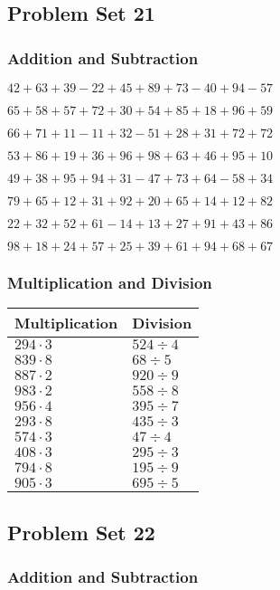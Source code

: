 \hypertarget{problem-set-21}{%
\subsection{Problem Set 21}\label{problem-set-21}}

\hypertarget{addition-and-subtraction-20}{%
\subsubsection{Addition and
Subtraction}\label{addition-and-subtraction-20}}

\(42+63+39-22+45+89+73-40+94-57\)

\(65+58+57+72+30+54+85+18+96+59\)

\(66+71+11-11+32-51+28+31+72+72\)

\(53+86+19+36+96+98+63+46+95+10\)

\(49+38+95+94+31-47+73+64-58+34\)

\(79+65+12+31+92+20+65+14+12+82\)

\(22+32+52+61-14+13+27+91+43+86\)

\(98+18+24+57+25+39+61+94+68+67\)

\hypertarget{multiplication-and-division-20}{%
\subsubsection{Multiplication and
Division}\label{multiplication-and-division-20}}

\begin{longtable}[]{@{}ll@{}}
\toprule
Multiplication & Division\tabularnewline
\midrule
\endhead
\(294\cdot3\) & \(524÷4\)\tabularnewline
\(839\cdot8\) & \(68÷5\)\tabularnewline
\(887\cdot2\) & \(920÷9\)\tabularnewline
\(983\cdot2\) & \(558÷8\)\tabularnewline
\(956\cdot4\) & \(395÷7\)\tabularnewline
\(293\cdot8\) & \(435÷3\)\tabularnewline
\(574\cdot3\) & \(47÷4\)\tabularnewline
\(408\cdot3\) & \(295÷3\)\tabularnewline
\(794\cdot8\) & \(195÷9\)\tabularnewline
\(905\cdot3\) & \(695÷5\)\tabularnewline
\bottomrule
\end{longtable}

\hypertarget{problem-set-22}{%
\subsection{Problem Set 22}\label{problem-set-22}}

\hypertarget{addition-and-subtraction-21}{%
\subsubsection{Addition and
Subtraction}\label{addition-and-subtraction-21}}

